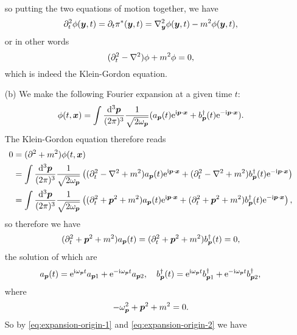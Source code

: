 \documentclass[hyperref, a4paper]{article}
\newcommand*{\ii}{\mathrm{i}}
\newcommand*{\ee}{\mathrm{e}}
\begin{document}
\begin{itemize}
\[\begin{aligned}
        \end{aligned}
    \]
    so putting the two equations of motion together, we have 
    \[
        \partial_t^2 \phi(\vb*{y}, t) = \partial_t \pi^*(\vb*{y}, t) = \laplacian_{\vb*{y}} \phi(\vb*{y}, t) - m^2 \phi(\vb*{y}, t),
    \]
    or in other words
    \[
        (\partial_t^2 - \laplacian) \phi + m^2 \phi = 0,
    \]
    which is indeed the Klein-Gordon equation.
    \item[(b)] We make the following Fourier expansion at a given time $t$:
    \begin{equation}
        \phi(t, \vb*{x}) = \int \frac{\dd[3]{\vb*{p}}}{(2\pi)^3} \frac{1}{\sqrt{2 \omega_{\vb*{p}}}} (a_{\vb*{p}}(t) \ee^{\ii \vb*{p} \cdot \vb*{x}} + b^\dagger_{\vb*{p}}(t) \ee^{- \ii \vb*{p} \cdot \vb*{x}}).
        \label{eq:expansion-origin-1}
    \end{equation}
    The Klein-Gordon equation therefore reads 
    \[
        \begin{aligned}
            0 &= (\partial^2 + m^2) \phi(t, \vb*{x}) \\
            &= \int \frac{\dd[3]{\vb*{p}}}{(2\pi)^3} \frac{1}{\sqrt{2 \omega_{\vb*{p}}}} \left( (\partial_t^2 - \laplacian + m^2) a_{\vb*{p}}(t) \ee^{\ii \vb*{p} \cdot \vb*{x}} + (\partial_t^2 - \laplacian + m^2) b^\dagger_{\vb*{p}}(t) \ee^{- \ii \vb*{p} \cdot \vb*{x}} \right) \\ 
            &= \int \frac{\dd[3]{\vb*{p}}}{(2\pi)^3} \frac{1}{\sqrt{2 \omega_{\vb*{p}}}} \left( (\partial_t^2 + \vb*{p}^2 + m^2) a_{\vb*{p}}(t) \ee^{\ii \vb*{p} \cdot \vb*{x}} + (\partial_t^2 + \vb*{p}^2 + m^2) b^\dagger_{\vb*{p}}(t) \ee^{- \ii \vb*{p} \cdot \vb*{x}} \right),
        \end{aligned}
    \]
    so therefore we have 
    \[
        (\partial_t^2 + \vb*{p}^2 + m^2) a_{\vb*{p}}(t) = (\partial_t^2 + \vb*{p}^2 + m^2) b^\dagger_{\vb*{p}}(t) = 0,
    \]
    the solution of which are 
    \begin{equation}
        a_{\vb*{p}}(t) = \ee^{\ii \omega_{\vb*{p}} t} a_{\vb*{p} 1} + \ee^{- \ii \omega_{\vb*{p}} t} a_{\vb*{p} 2}, \quad b^\dagger_{\vb*{p}}(t) = \ee^{\ii \omega_{\vb*{p}} t} b^\dagger_{\vb*{p} 1} + \ee^{- \ii \omega_{\vb*{p}} t} b^\dagger_{\vb*{p} 2},
        \label{eq:expansion-origin-2}
    \end{equation}
    where 
    \[
        -\omega_{\vb*{p}}^2 + \vb*{p}^2 + m^2 = 0. 
    \]
    So by \eqref{eq:expansion-origin-1} and \eqref{eq:expansion-origin-2} we have 
    \[
        \begin{aligned}

\end{aligned}\]
\end{itemize}
\end{document}
